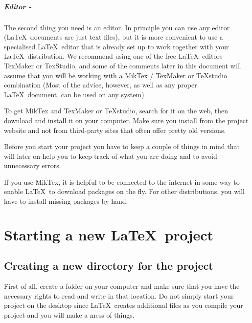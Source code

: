 \documentclass[]{tufte-book} %
\begin{document}
\paragraph{Editor -}The second thing you need is an editor. In principle you can use any editor (\LaTeX\ documents are just text files), but it is more convenient to use a specialised \LaTeX\  editor that is already set up to work together with your \LaTeX\ distribution.  We recommend using one of the free \LaTeX\ editors TexMaker or TexStudio, and some of the comments later in this document will assume that you will be working with a MikTex / TexMaker or TeXstudio combination (Most of the advice, however, as well as any proper \LaTeX\ document, can be used on any system).

To get MikTex and TexMaker or TeXstudio, search for it on the web, then download and install it on your computer. Make sure you install from the project website and not from third-party sites that often offer pretty old versions. 
  
Before you start your project you have to keep a couple of things in mind that will later on help you to keep track of what you are doing and to avoid unnecessary errors.
 
If you use MikTex, it is helpful to be connected to the internet in some way to enable \LaTeX\ to download packages on the fly. For other distributions, you will have to install missing packages by hand. 


\chapter{Starting a new \LaTeX\ project}


\section{Creating a new directory for the project}

First of all, create a folder on your computer and make sure that you have the necessary rights to read and write in that location. Do not simply start your project on the desktop since \LaTeX\ creates additional files as you compile your project and you will make a mess of things.
 
\end{document}
